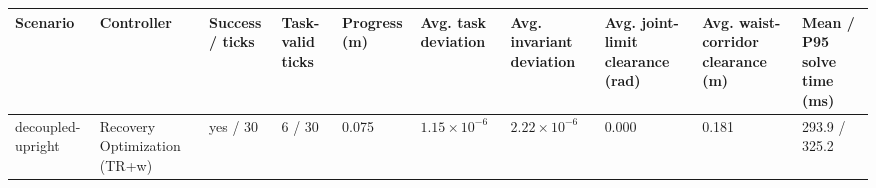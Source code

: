 \begin{tabular}{llllllllll}
\toprule
Scenario & Controller & Success / ticks & Task-valid ticks & Progress (m) & Avg. task deviation & Avg. invariant deviation & Avg. joint-limit clearance (rad) & Avg. waist-corridor clearance (m) & Mean / P95 solve time (ms) \\
\midrule
decoupled-upright & Recovery Optimization (TR+w) & yes / 30 & 6 / 30 & 0.075 & $1.15\times 10^{-6}$ & $2.22\times 10^{-6}$ & 0.000 & 0.181 & 293.9 / 325.2 \\
\bottomrule
\end{tabular}
